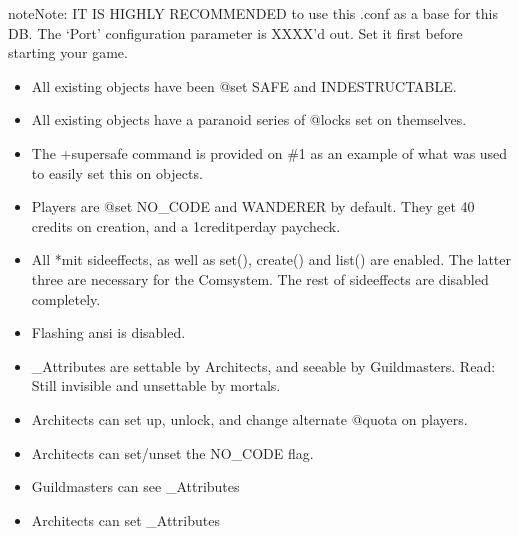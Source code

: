 \documentclass[letterpaper,10pt,english]{sphinxmanual}
\begin{document}
\begin{sphinxadmonition}{note}{Note:}
\sphinxAtStartPar
IT IS HIGHLY RECOMMENDED to use this .conf as a base for this DB.
The ‘Port’ configuration parameter is XXXX’d out. Set it first before starting
your game.
\end{sphinxadmonition}
\begin{itemize}
\item {} 
\sphinxAtStartPar
All existing objects have been @set SAFE and INDESTRUCTABLE.

\item {} 
\sphinxAtStartPar
All existing objects have a paranoid series of @locks set on themselves.

\item {} 
\sphinxAtStartPar
The +supersafe command is provided on \#1 as an example of what was used to
easily set this on objects.

\item {} 
\sphinxAtStartPar
Players are @set NO\_CODE and WANDERER by default. They get 40 credits on
creation, and a 1\sphinxhyphen{}credit\sphinxhyphen{}per\sphinxhyphen{}day paycheck.

\item {} 
\sphinxAtStartPar
All *mit sideeffects, as well as set(), create() and list() are enabled. The
latter three are necessary for the Comsystem. The rest of sideeffects are
disabled completely.

\item {} 
\sphinxAtStartPar
Flashing ansi is disabled.

\item {} 
\sphinxAtStartPar
\_Attributes are settable by Architects, and seeable by Guildmasters. Read:
Still invisible and unsettable by mortals.

\item {} 
\sphinxAtStartPar
Architects can set up, unlock, and change alternate @quota on players.

\item {} 
\sphinxAtStartPar
Architects can set/unset the NO\_CODE flag.

\item {} 
\sphinxAtStartPar
Guildmasters can see \_Attributes

\item {} 
\sphinxAtStartPar
Architects can set \_Attributes

\end{itemize}
\end{document}
